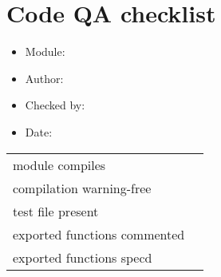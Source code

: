 \pagestyle{empty}

\section*{Code QA checklist}
\Large
\begin{itemize}
\item Module:
\item Author:
\item Checked by:
\item Date:
\end{itemize}
\Large
\begin{tabularx}{\textwidth}{ X | X }
module compiles & \\
compilation warning-free & \\
test file present & \\
exported functions commented & \\
exported functions specd & \\
\end{tabularx}
\clearpage
\endinput
